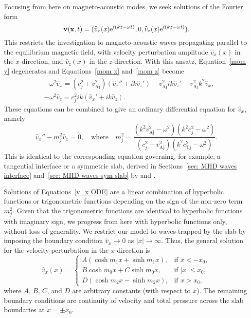 Focusing from here on magneto-acoustic modes, we seek solutions of the Fourier form
\begin{equation}
\mathbf{v}(\mathbf{x},t)=(\widehat{v}_x(x)\textrm{e}^{i(kz-\omega{t})}, 0, \widehat{v}_z(x)\textrm{e}^{i(kz-\omega{t})}).
\label{vcomponents}
\end{equation}
This restricts the investigation to magneto-acoustic waves propagating parallel to the equilibrium magnetic field, with velocity perturbation amplitude $\widehat{v}_x(x)$ in the $x$-direction, and $\widehat{v}_z(x)$ in the $z$-direction. With this ansatz, Equation~\eqref{mom y} degenerates and Equations~\eqref{mom x} and~\eqref{mom z} become
\begin{align}
&-\omega^2\widehat{v}_x = (c_j^2+v_\textrm{Aj}^2)(\widehat{v}_x'' + ik\widehat{v}_z') - v_\textrm{Aj}^2ik\widehat{v}_z'-v_\textrm{Aj}^2k^2\widehat{v}_x, \label{mom x 2} \\
&-\omega^2\widehat{v}_z = c_j^2ik(\widehat{v}_x' + ik\widehat{v}_z). \label{mom z 2}
\end{align}
These equations can be combined to give an ordinary differential equation for $\widehat{v}_x$, namely
\begin{equation}
\widehat{v}_x'' - m_j^2\widehat{v}_x = 0, \quad \text{where} \quad
m_j^2 = \frac{(k^2v_\textrm{Aj}^2 - \omega^2)(k^2c_j^2 - \omega^2)}{(c_j^2 + v_\textrm{Aj}^2)(k^2c_\textrm{Tj}^2 - \omega^2)}. \label{v_x ODE}
\end{equation}
This is identical to the corresponding equation governing, for example, a tangential interface or a symmetric slab, derived in Sections~\ref{sec: MHD waves interface} and~\ref{sec: MHD waves sym slab} by \cite{rob81a} and \cite{edw_etal82}.

Solutions of Equations~\eqref{v_x ODE} are a linear combination of hyperbolic functions or trigonometric functions depending on the sign of the non-zero term $m_j^2$. Given that the trigonometric functions are identical to hyperbolic functions with imaginary sign, we progress from here with hyperbolic functions only, without loss of generality. We restrict our model to waves trapped by the slab by imposing the boundary condition $\widehat{v}_x \to 0$ as $|x| \to \infty$. Thus, the general solution for the velocity perturbation in the $x$-direction is
\begin{equation}
\widehat{v}_x(x)=
\begin{cases}
A(\cosh{m_1x} + \sinh{m_1x}), & \text{if } x < -x_0, \\
B\cosh{m_0x} + C\sinh{m_0x}, & \text{if } |x| \leq {x_0}, \\
D(\cosh{m_2x} - \sinh{m_2x}), & \text{if  } x > x_0, 
\end{cases}
\label{vsoln}
\end{equation}
where $A$, $B$, $C$, and $D$ are arbitrary constants (with respect to $x$). The remaining boundary conditions are continuity of velocity and total pressure across the slab boundaries at $x = \pm{x_0}$.

